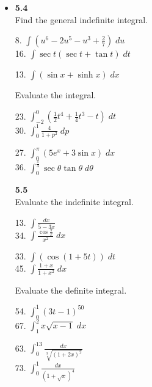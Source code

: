 \documentclass{letter}
\begin{document}
	\begin{itemize}
		\item[] \textbf{5.4}\\
		
		Find the general indefinite integral.\\
		\begin{minipage}[t]{0.5\textwidth}
			8. $\int (u^6 - 2u^5 - u^3 + \frac27)\; du$\\
			16. $\int \sec t(\sec t + \tan t)\; dt$\\
		\end{minipage}
		\begin{minipage}[t]{0.5\textwidth}
			13. $\int (\sin x + \sinh x)\; dx$
		\end{minipage}
		
		Evaluate the integral.\\
		\begin{minipage}[t]{0.5\textwidth}
			23. $\int_{-2}^{0} (\frac12 t^4 + \frac14t^3 - t) \; dt$\\
			30. $\int_0^1 \frac{4}{1+p^2}\; dp$
		\end{minipage}
		\begin{minipage}[t]{0.5\textwidth}
			27. $\int_0^\pi (5e^x + 3 \sin x) \; dx$\\
			36. $\int_0^\frac{\pi}{4} \sec \theta \tan \theta \; d \theta$\\
		\end{minipage}
		
		\textbf{5.5}\\
		
		Evaluate the indefinite integral.\\
		\begin{minipage}[t]{0.5\textwidth}
			13. $\int \frac{dx}{5-3x}$\\
			34. $\int \frac{\cos \frac{\pi}{x}}{
				x^2} \; dx$
		\end{minipage}
		\begin{minipage}[t]{0.5\textwidth}
			33. $\int (\cos (1+5t)) \; dt$\\
			45. $\int \frac{1+x}{1+x^2}\; dx$\\
		\end{minipage}
		
		Evaluate the definite integral.\\
		\begin{minipage}[t]{0.5\textwidth}
			54. $\int_0^1 (3t-1)^{50}$\\
			67. $\int_1^2 x\sqrt{x-1}\; dx$
		\end{minipage}
		\begin{minipage}[t]{0.5\textwidth}
			63. $\int_0^{13} \frac{dx}{\sqrt[3]{(1+2x)^2}}$\\
			73. $\int_0^1 \frac{dx}{(1+\sqrt x)^4}$\\
		\end{minipage}\\
		

\end{itemize}
\end{document}
